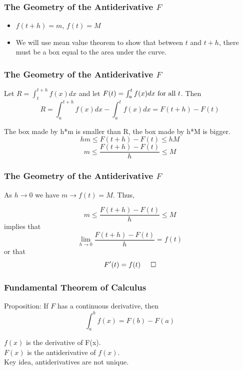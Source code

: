 \documentclass{beamer}
\numberwithin{equation}{section}
\begin{document}
\begin{frame}
\frametitle{The Geometry of the Antiderivative $F$}

\begin{center}
\end{center}
\begin{itemize}
\item $f(t+h)=m$, $f(t)=M$
\item We will use mean value theorem to show that between $t$ and $t+h$, there must be a box equal to the area under the curve.
\end{itemize}
\end{frame}







\begin{frame}
\frametitle{The Geometry of the Antiderivative $F$}

\begin{center}
\end{center}
Let $R=\int_t^{t+h}f(x) dx$ and let $F(t)=\int_a^t f(x) dx \hbox{ for all } t$. \pause Then $$R=\int_a^{t+h}f(x)dx-\int_a^{t}f(x)dx=F(t+h)-F(t)$$ \pause

The box made by h*m is smaller than R, the box made by h*M is bigger.
$$ hm\leq F(t+h)-F(t)\leq hM$$\pause
$$m\leq \frac{F(t+h)-F(t)}{h}\leq M$$ 

\end{frame}




\begin{frame}
\frametitle{The Geometry of the Antiderivative $F$}

\begin{center}
\end{center}

As $h\rightarrow 0$ we have $m\rightarrow f(t)=M$. \pause Thus,

$$m\leq \frac{F(t+h)-F(t)}{h}\leq M$$ \pause implies that $$\lim_{h\rightarrow 0} \frac{F(t+h)-F(t)}{h} =f(t)$$
or that $$F^\prime(t)=f(t) \hspace{.2in }\Box$$

\end{frame}



\begin{frame}
\frametitle{Fundamental Theorem of Calculus}

\begin{theorem}
Proposition: If $F$ has a continuous derivative, then $$\int_a^b f(x)=F(b)-F(a)$$
\end{theorem} \pause

$f(x)$ is the derivative of F(x).\\
$F(x)$ is the antiderivative of $f(x)$.\\
Key idea, antiderivatives are not unique.
\end{frame}
\end{document}
